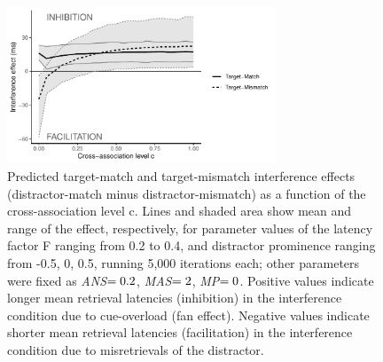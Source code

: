 \documentclass{cambridge7A}\usepackage[]{graphicx}\usepackage[]{color}
\newcommand{\actrcue}[1]{\texttt{\uppercase{#1}}}
\begin{document}
\begin{figure}[!htbp]
\centering
\includegraphics[width=8cm]{figures/cueconfusion}

%
 \caption{Predicted target-match and target-mismatch interference effects (distractor-match minus  distractor-mismatch) as a function of the cross-association level c. Lines and shaded area show mean and range of the effect, respectively, for parameter values of the latency factor F ranging from 0.2 to 0.4, and distractor prominence ranging from -0.5, 0, 0.5, running 5,000 iterations each; other parameters were fixed as \textit{ANS}$\protect =0.2$, \textit{MAS}$\protect =2$, \textit{MP}$\protect =0$. Positive values indicate longer mean retrieval latencies (inhibition) in the interference condition due to cue-overload (fan effect). Negative values indicate shorter mean retrieval latencies (facilitation) in the interference condition due to misretrievals of the distractor.}\label{fig:cueconf} 
\end{figure}





\end{document}
